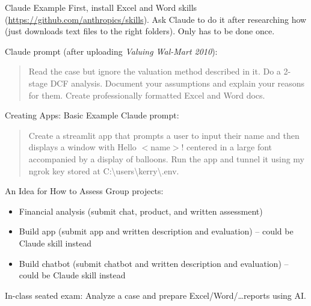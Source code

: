 \documentclass[aspectratio=169]{beamer}
\begin{document}
\begin{frame}{Claude Example}
First, install Excel and Word skills (\url{https://github.com/anthropics/skills}).  
Ask Claude to do it after researching how (just downloads text files to the right folders).  Only has to be done once.


\vspace{1em}
Claude prompt (after uploading \textit{Valuing Wal-Mart 2010}):

\vspace{1em}
\begin{quote}
Read the case but ignore the valuation method described in it.  Do a 2-stage DCF analysis.  Document your assumptions and explain your reasons for them.  Create professionally formatted Excel and Word docs.
\end{quote}
\end{frame}

\begin{frame}{Creating Apps: Basic Example}
    Claude prompt:

    \vspace{1em}
    \begin{quote}
    Create a streamlit app that prompts a user to input their name and then displays a window with Hello $<$name$>$! centered in a large font accompanied by a display of balloons. Run the app and tunnel it using my ngrok key stored at C:\textbackslash users\textbackslash kerry\textbackslash .env.
        \end{quote}
    \end{frame}

\begin{frame}{An Idea for How to Assess}
    Group projects:
    \begin{itemize}
        \item Financial analysis (submit chat, product, and written assessment)
        \item Build app (submit app and written description and evaluation) -- could be Claude skill instead
        \item Build chatbot (submit chatbot and written description and evaluation) -- could be Claude skill instead
    \end{itemize}

\vspace{1em}

    In-class seated exam: Analyze a case and prepare Excel/Word/\ldots reports \alert{using AI}.
\end{frame}
\end{document}
